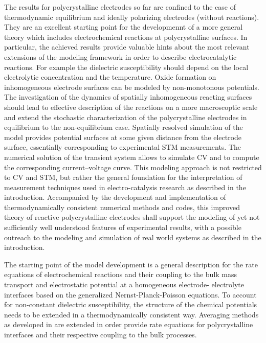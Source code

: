 \documentclass[a4paper,10pt]{article}
\begin{document}
The results for polycrystalline electrodes so far are confined to the case of thermodynamic equilibrium and ideally polarizing electrodes (without reactions).
They are an excellent starting point for the developmennt of a more general theory which includes electrochemical reactions at polycrystalline surfaces.
In particular, the achieved results provide valuable hints about the most relevant extensions of the modeling framework in order to describe electrocatalytic reactions.
For example the dielectric susceptibility should depend on the local electrolytic concentration
and the temperature. 
Oxide formation on inhomogeneous electrode surfaces can be modeled
by non-monotonous potentials.
The investigation of the dynamics of spatially inhomogeneous reacting surfaces
should lead to effective description of the reactions on a more macroscoptic scale
and extend the stochastic characterization of the polycrystalline electrodes in equilibrium
to the non-equilibrium case.
%
Spatially resolved simulation of the model provides potential surfaces at
some given distance from the electrode surface, essentially corresponding to experimental STM measurements. 
The numerical solution of the transient system allows to simulate CV and to compute the corresponding current--voltage curve. 
This modeling approach is not restricted to CV and STM, but rather the general foundation for the interpretation of 
measurement techniques used in electro-catalysis research as described in the introduction.
%
Accompanied by the development
and implementation  of thermodynamically consistent  numerical methods
and codes, this improved theory of reactive polycrystalline electrodes
shall support  the modeling  of yet  not sufficiently  well understood
features  of experimental  results, with  a possible  outreach to  the
modeling  and simulation  of real  world systems  as described  in the
introduction.




The starting point  of the model development is  a general description
for the rate  equations of electrochemical reactions and their coupling to the bulk mass transport
and electrostatic potential at a homogeneous
electrode- electrolyte  interfaces based on the generalized Nernst-Planck-Poisson equations.
To account for non-constant dielectric susceptibility, the structure of the chemical potentials
needs to be extended in a thermodynamically consistent way.
Averaging methods as  developed in
\cite{JES}  are   extended  in   order  provide  rate   equations  for
polycrystalline interfaces  and their respective coupling to the bulk processes.
\end{document}
